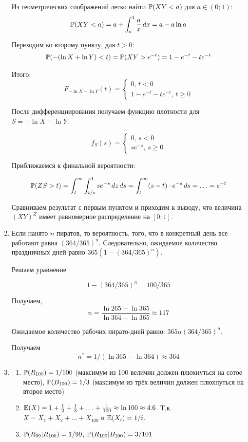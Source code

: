 \documentclass[12pt, a4paper]{article}\usepackage[]{graphicx}\usepackage[]{color}
\begin{document}
\begin{enumerate}
					Из геометрических соображений легко найти $\P(XY < a)$ для $a\in (0;1)$:
					\[
					\P(XY < a)=a + \int_a^1 \frac{a}{x} \, dx=a-a\ln a
					\]

					Переходим ко второму пункту, для $t>0$:
					\[
					\P(-(\ln X + \ln Y) < t)=\P(XY > e^{-t})= 1-e^{-t} -t e^{-t}
					\]

					Итого:
					\[
					F_{-\ln X - \ln Y}(t)=\begin{cases}
					0, \, t < 0 \\
					1-e^{-t} - te^{-t}, \, t \geq 0
					\end{cases}
					\]

					После дифференциирования получаем функцию плотности для $S=-\ln X - \ln Y$:

					\[
					f_S(s)=\begin{cases}
					0, \, s < 0 \\
					se^{-s}, \, s \geq 0
					\end{cases}
					\]

					Приближаемся к финальной вероятности:

					\[
					\P(ZS > t)= \int_t^{\infty} \int_{t/s}^1  se^{-s} \, dz\, ds=
					\int_t^{\infty} (s-t)\cdot e^{-s} \, ds= \ldots = e^{-t}
					\]

					Сравниваем результат с первым пунктом и приходим к выводу, что величина $(XY)^Z$ имеет равномерное распределение на $[0;1]$.

					\item Если нанято $n$ пиратов, то вероятность, того, что в конкретный день все работают равна $(364/365)^n$. Следовательно, ожидаемое количество праздничных дней равно $365(1-(364/365)^n)$.

					Решаем уравнение

					\[
					1-(364/365)^n=100/365
					\]

					Получаем,
					\[
					n=\frac{\ln 265- \ln 365}{ \ln 364 - \ln 365}\approx 117
					\]

					Ожидаемое количество рабочих пирато-дней равно: $365n(364/365)^n$.

					Получаем
					\[
					n^*=1/(\ln 365 - \ln 364)\approx 364
					\]

					\item
					\begin{enumerate}
						\item $\P(R_{100})=1/100$ (максимум из 100 величин должен плюхнуться на сотое место), $\P(B_{100})=1/3$ (максимум из трёх величин должен плюхнуться на второе место)
						\item $\E(X)=1+\frac{1}{2} + \frac{1}{3}+\ldots + \frac{1}{100}\approx \ln 100 \approx 4.6$. Т.к. $X=X_1+X_2+\ldots + X_{100}$ и $\E(X_i)=1/i$.
						\item $\P(R_{99} | R_{100})=1/99$, $\P(R_{100}|B_{100})=3/101$


\end{enumerate}
\end{enumerate}
\end{document}

